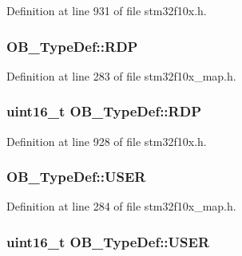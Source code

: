 Definition at line 931 of file stm32f10x.\+h.

\subsubsection[{\texorpdfstring{R\+DP}{RDP}}]{ O\+B\+\_\+\+Type\+Def\+::\+R\+DP}\hypertarget{struct_o_b___type_def_abdf1c3c20dff30e5583c1aeecc598b2e}{}\label{struct_o_b___type_def_abdf1c3c20dff30e5583c1aeecc598b2e}


Definition at line 283 of file stm32f10x\+\_\+map.\+h.

\subsubsection[{\texorpdfstring{R\+DP}{RDP}}]{ {\bf uint16\+\_\+t} O\+B\+\_\+\+Type\+Def\+::\+R\+DP}\hypertarget{struct_o_b___type_def_ad9f9ae594003c39cc27f147e29a130bb}{}\label{struct_o_b___type_def_ad9f9ae594003c39cc27f147e29a130bb}


Definition at line 928 of file stm32f10x.\+h.

\subsubsection[{\texorpdfstring{U\+S\+ER}{USER}}]{ O\+B\+\_\+\+Type\+Def\+::\+U\+S\+ER}\hypertarget{struct_o_b___type_def_afdfc00ac036ace8643ce3305da811a39}{}\label{struct_o_b___type_def_afdfc00ac036ace8643ce3305da811a39}


Definition at line 284 of file stm32f10x\+\_\+map.\+h.

\subsubsection[{\texorpdfstring{U\+S\+ER}{USER}}]{ {\bf uint16\+\_\+t} O\+B\+\_\+\+Type\+Def\+::\+U\+S\+ER}\hypertarget{struct_o_b___type_def_ab0292062a80446c97dac24604bd8ed8e}{}\label{struct_o_b___type_def_ab0292062a80446c97dac24604bd8ed8e}


